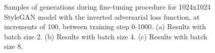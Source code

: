   \begin{figure}[!htbp]
    \centering
    \hfill
    \hfill
    \caption[Samples of generations during fine-tuning procedure for 1024x1024 StyleGAN model with the inverted adversarial loss function]{Samples of generations during fine-tuning procedure for 1024x1024 StyleGAN model with the inverted adversarial loss function, at increments of 100, between training step 0-1000. (a) Results with batch size 2. (b) Results with batch size 4. (c) Results with batch size 8.}
    \label{fig:c4:1024-OG-samples}
  \end{figure}

